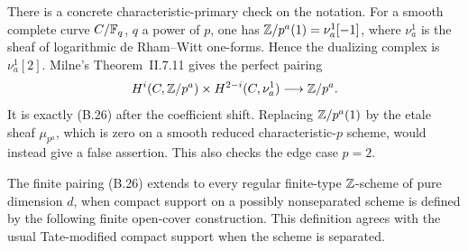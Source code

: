 There is a concrete characteristic-primary check on the notation.
For a smooth complete curve \(C/\mathbb F_q\), \(q\) a power of \(p\),
one has
\(\mathbb Z/p^a(1)=\nu_a^1[-1]\), where \(\nu_a^1\) is the sheaf
of logarithmic de Rham--Witt one-forms.  Hence the dualizing complex
is \(\nu_a^1[2]\).  Milne's Theorem~II.7.11 gives the perfect
pairing
\[
 H^i(C,\mathbb Z/p^a)\times H^{2-i}(C,\nu_a^1)
 \longrightarrow\mathbb Z/p^a.
\]
It is exactly (B.26) after the coefficient shift.  Replacing
\(\mathbb Z/p^a(1)\) by the etale sheaf \(\mu_{p^a}\), which is zero
on a smooth reduced characteristic-\(p\) scheme, would instead give
a false assertion.  This also checks the edge case \(p=2\).

\begin{proposition}
\label{prop:B-finite-duality-nonsep}
The finite pairing (B.26) extends to every regular finite-type
\(\mathbb Z\)-scheme of pure dimension \(d\), when compact support
on a possibly nonseparated scheme is defined by the following
finite open-cover construction.  This definition agrees with the
usual Tate-modified compact support when the scheme is separated.
\end{proposition}
